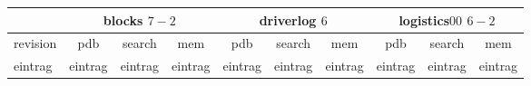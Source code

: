 \documentclass[a4paper,12pt]{scrartcl}
\begin{document}
\begin{tabular}{|l|c|c|c|c|c|c|c|c|c|}\hline
& \multicolumn{3}{c|}{blocks $7-2$} & \multicolumn{3}{c|}{driverlog $6$} & \multicolumn{3}{c|}{logistics$00$ $6-2$}\\\hline
revision & pdb & search & mem & pdb & search & mem & pdb & search & mem\\\hline
eintrag & eintrag & eintrag & eintrag & eintrag & eintrag & eintrag & eintrag & eintrag & eintrag\\\hline
\end{tabular}
\end{document}

